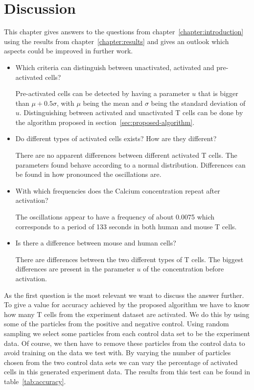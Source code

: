 \chapter{Discussion}
\label{chapter:conclusion}

This chapter gives answers to the questions from chapter~\ref{chapter:introduction} using the results from chapter~\ref{chapter:results} and gives an outlook which aspects could be improved in further work.

\begin{itemize}
	\item Which criteria can distinguish between unactivated, activated and pre-activated cells?
	
	Pre-activated cells can be detected by having a parameter $u$ that is bigger than ${\mu + 0.5 \sigma}$, with $\mu$ being the mean and $\sigma$ being the standard deviation of $u$. Distinguishing between activated and unactivated T cells can be done by the algorithm proposed in section~\ref{sec:proposed-algorithm}.
	\item Do different types of activated cells exists? How are they different?
	
	There are no apparent differences between different activated T cells. The parameters found behave according to a normal distribution. Differences can be found in how pronounced the oscillations are.
	\item With which frequencies does the Calcium concentration repeat after activation?
	
	The oscillations appear to have a frequency of about 0.0075 which corresponds to a period of 133 seconds in both human and mouse T cells.
	\item Is there a difference between mouse and human cells?
	
	There are differences between the two different types of T cells. The biggest differences are present in the parameter $u$ of the \Calcium concentration before activation.
\end{itemize}

As the first question is the most relevant we want to discuss the answer further. To give a value for accuracy achieved by the proposed algorithm we have to know how many T cells from the experiment dataset are activated. We do this by using some of the particles from the positive and negative control. Using random sampling we select some particles from each control data set to be the experiment data. Of course, we then have to remove these particles from the control data to avoid training on the data we test with. By varying the number of particles chosen from the two control data sets we can vary the percentage of activated cells in this generated experiment data. The results from this test can be found in table~\ref{tab:accuracy}.

